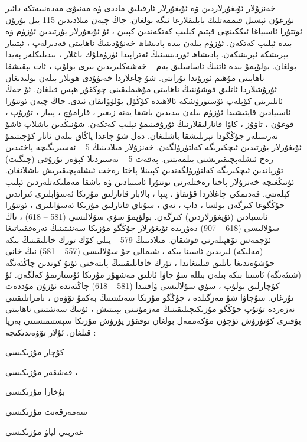 \documentclass[a4paper]{article}
\begin{document}
خەنزۇلار ئۇيغۇرلاردىن ۋە ئۇيغۇرلار ئارقىلىق ماددى ۋە مەنىۋى مەدەنىيەتكە دائىر نۇرغۇن ئېسىل قىممەتلىك بايلىقلارغا ئىگە بولغان. جاڭ چيەن مىلادىدىن 115 يىل بۇرۇن ئوتتۇرا ئاسىياغا ئىككىنچى قېتىم كېلىپ كەتكەندىن كېيىن ، ئۇ ئۇيغۇرلار يۇرتىدىن ئۈزۈم ۋە بىدە ئېلىپ كەتكەن. ئۈزۈم بىلەن بىدە پادىشاھ خەنۋۇدىنىڭ ناھايىتى قەدىرلەپ ، ئېتىبار بېرىشكە ئېرىشكەن. پادىشاھ ئوردىسىنىڭ ئەتراپىدا ئۈزۈملۇك باغلار ، بىدىلىكلەر پەيدا بولغان. بولۇپمۇ بىدە ئاتنىڭ ئاساسلىق يەم – خەشەكلىرىدىن بىرى بولۇپ ، ئات بېقىشقا ناھايىتى مۇھىم ئورۇندا تۇراتتى. شۇ چاغلاردا خەنۋۇدى ھونلار بىلەن بولىدىغان ئۇرۇشلاردا ئاتلىق قوشۇننىڭ ناھايىتى مۇھىملىقىنى چوڭقۇر ھېس قىلغان. ئۇ جەڭ ئاتلىرىنى كۆپلەپ ئۆستۈرۈشكە ئالاھىدە كۆڭۈل بۆلۈۋاتقان ئىدى. جاڭ چيەن ئوتتۇرا ئاسىيادىن قايتىشىدا ئۈزۈم بىلەن بىدىدىن باشقا يەنە زىغىر ، قارامۇچ ، پىياز ، تۇرۇپ ، قوغۇن ، تاۋۇز ، كاۋا قاتارلىقلارنىڭ ئۇرۇقىنىمۇ ئېلىپ كەتكەن. شۇنىڭدىن باشلاپ ئاشۇ نەرسىلەر جۇڭگودا تېرىلىشقا باشلىغان. دەل شۇ چاغدا ياڭاق بىلەن ئانار كۆچىتىمۇ ئۇيغۇرلار يۇرتىدىن ئىچكىرىگە كەلتۈرۈلگەن. خەنزۇلار مىلادىنىڭ 5 – ئەسىرىگىچە پاختىدىن رەخ ئىشلەپچىقىرىشنى بىلمەيتتى. پەقەت 5 – ئەسىردىلا كېۋەز ئۇرۇقى (چىگىت) تۇرپاندىن ئىچكىرىگە كەلتۈرۈلگەندىن كېيىنلا پاختا رەخت ئىشلەپچىقىرىش باشلانغان. ئۇنىڭغىچە خەنزۇلار پاختا رەختلەرنى ئوتتۇرا ئاسىيادىن ۋە باشقا مەملىكەتلەردىن ئېلىپ كېلەتتى. قەدىمكى چاغلاردا قۇنقاۋ ، پىپا ، بالابار قاتارلىق مۇزىكا ئەسۋابلىرى ئىراندىن جۇڭگوغا كىرگەن بولسا ، داپ ، نەي ، سۇناي قاتارلىق مۇزىكا ئەسۋابلىرى ، ئوتتۇرا ئاسىيادىن (ئۇيغۇرلاردىن) كىرگەن. بولۇپمۇ سۈي سۇلالىسى (581 – 618) ، تاڭ سۇلالىسى (618 – 907) دەۋرىدە ئۇيغۇرلار جۇڭگو مۇزىكا سەنئىتىنىڭ تەرەققىياتىغا ئۆچمەس تۆھپىلەرنى قوشقان. مىلادىنىڭ 579 – يىلى كۆك تۈرك خانلىقىنىڭ بىكە (مەلىكە) لىرىدىن ئاسىنا بىكە ، شىمالى جۇ سۇلالىسى (557 – 581) نىڭ خانى جۇشۇەندىغا ياتلىق قىلىنغاندا ، تۈرك خاقانلىقىنىڭ پايتەختى ئۇتۇ كۈندىن چاڭئەنگە (شىئەنگە) ئاسىنا بىكە بىلەن بىللە سۇ جاۋا ئاتلىق مەشھۇر مۇزىكا ئۇستازىمۇ كەلگەن. ئۇ كۇچارلىق بولۇپ ، سۈي سۇلالىسى ۋاقتىدا (581 – 618) چاڭئەندە ئۇزۇن مۇددەت تۇرغان. سۇجاۋا شۇ مەزگىلدە ، جۇڭگو مۇزىكا سەنئىتىنىڭ بەكمۇ تۆۋەن ، نامراتلىقىنى نەزەردە تۇتۇپ جۇڭگو مۇزىكىچىلىقىنىڭ مەزمۇنىنى بېيىتىش ، ئۇنىڭ سەنئىتىنى ناھايىتى يۇقىرى كۆتۈرۈش ئۈچۈن مۇكەممەل بولغان توققۇز يۈرۈش مۇزىكا سېستىمىسىنى بەرپا قىلغان. ئۇلار تۆۋەندىكىچە :



كۇچار مۇزىكىسى

قەشقەر مۇزىكىسى ،

بۇخارا مۇزىكىسى

سەمەرقەنت مۇزىكىسى

غەربىي لياۋ مۇزىكىسى
\end{document}
